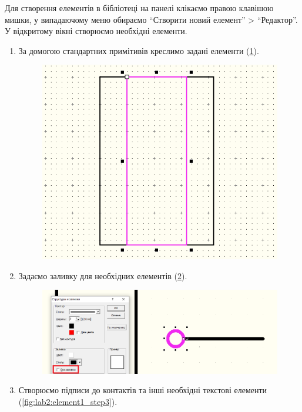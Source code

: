 Для створення елементів в бібліотеці на панелі клікаємо правою клавішою мишки, у випадаючому меню
обираємо ``Створити новий елемент'' > ``Редактор''. У відкритому вікні створюємо необхідні елементи.

\begin{enumerate}[leftmargin=*]
\item За домогою стандартних примітивів креслимо задані елементи (\ref{fig:lab2:element1_step1}).
  \begin{figure}[!htb]
    \centering \includegraphics[width=0.6\linewidth]{./images/lab2/element1_step1.png}
    \caption{\label{fig:lab2:element1_step1}}
  \end{figure}
  \FloatBarrier
\item Задаємо заливку для необхідних елементів (\ref{fig:lab2:element1_step2}).
  \begin{figure}[!htb]
    \centering \includegraphics[width=0.9\linewidth]{./images/lab2/element1_step2.png}
    \caption{\label{fig:lab2:element1_step2}}
  \end{figure}
  \FloatBarrier
\item Створюємо підписи до контактів та інші необхідні текстові елементи
  (\ref{fig:lab2:element1_step3}).
  \begin{figure}[!htb]

\end{figure}
\end{enumerate}
